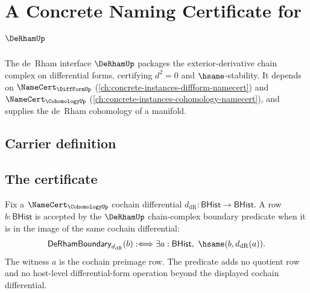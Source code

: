 \chapter{A Concrete Naming Certificate for $\DeRhamUp$}
\label{ch:concrete-instances-deRham-namecert}

The de~Rham interface $\DeRhamUp$ packages the exterior-derivative chain complex on differential forms, certifying $d^2 = 0$ and $\hsame$-stability. It depends on $\NameCert_{\DiffFormUp}$ (\autoref{ch:concrete-instances-diffform-namecert}) and $\NameCert_{\CohomologyUp}$ (\autoref{ch:concrete-instances-cohomology-namecert}), and supplies the de~Rham cohomology of a manifold.

\section{Carrier definition}
\label{sec:deRham-carrier}

\section{The certificate}
\label{sec:deRham-certificate}

\begin{definition}
\label{def:derham-chain-complex-boundary-row}
Fix a $\NameCert_{\CohomologyUp}$ cochain differential
$d_{\mathrm{dR}}:\mathsf{BHist}\to\mathsf{BHist}$. A row
$b:\mathsf{BHist}$ is accepted by the $\DeRhamUp$ chain-complex boundary
predicate when it is in the image of the same cochain differential:
$$
\mathsf{DeRhamBoundary}_{d_{\mathrm{dR}}}(b)
:\Longleftrightarrow
\exists a:\mathsf{BHist},\ \hsame(b,d_{\mathrm{dR}}(a)).
$$
The witness $a$ is the cochain preimage row. The predicate adds no quotient
row and no host-level differential-form operation beyond the displayed
cochain differential.
\end{definition}

